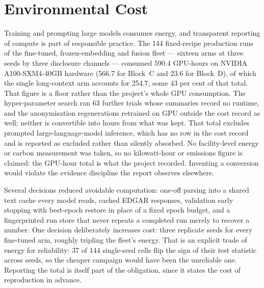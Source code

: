 \section{Environmental Cost}

Training and prompting large models consumes energy, and transparent reporting of compute is part of responsible practice. The 144 fixed-recipe production runs of the fine-tuned, frozen-embedding and fusion fleet --- sixteen arms at three seeds by three disclosure channels --- consumed 590.4 GPU-hours on NVIDIA A100-SXM4-40GB hardware (566.7 for Block~C and 23.6 for Block~D), of which the single long-context arm accounts for 254.7, some 43 per cent of that total. %
That figure is a floor rather than the project's whole GPU consumption. The hyper-parameter search ran 63 further trials whose summaries record no runtime, and the anonymisation regenerations retrained on GPU outside the cost record as well; neither is convertible into hours from what was kept. %
That total excludes prompted large-language-model inference, which has no row in the cost record and is reported as excluded rather than silently absorbed. %
No facility-level energy or carbon measurement was taken, so no kilowatt-hour or emissions figure is claimed: the GPU-hour total is what the project recorded. Inventing a conversion would violate the evidence discipline the report observes elsewhere.

Several decisions reduced avoidable computation: one-off parsing into a shared text cache every model reads, cached EDGAR responses, validation early stopping with best-epoch restore in place of a fixed epoch budget, and a fingerprinted run store that never repeats a completed run merely to recover a number. One decision deliberately increases cost: three replicate seeds for every fine-tuned arm, roughly tripling the fleet's energy. That is an explicit trade of energy for reliability: 37 of 144 single-seed cells flip the sign of their test statistic across seeds, %
so the cheaper campaign would have been the unreliable one. Reporting the total is itself part of the obligation, since it states the cost of reproduction in advance.
